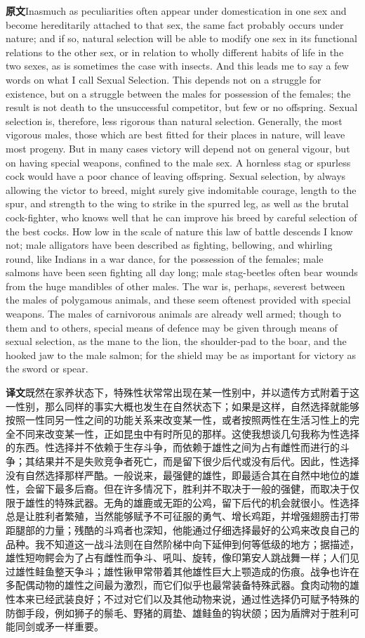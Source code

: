 \documentclass[UTF8,zihao=-4]{ctexart}
\newcommand{\BodyFont}{\fontsize{10.5pt}{15.5pt}\selectfont}
\newcommand{\origlabel}{\textbf{原文}\quad}
\newcommand{\translabel}{\textbf{译文}\quad}
\newenvironment{enblock}{\par\noindent\begingroup\BodyFont\origlabel}{\par\endgroup}
\newenvironment{zhblock}{\par\noindent\begingroup\BodyFont\translabel}{\par\endgroup\vspace{0.35em}}
\newcommand{\pair}[2]{\begin{enblock}#1\end{enblock}\begin{zhblock}#2\end{zhblock}}
\begin{document}
\pair{Inasmuch as peculiarities often appear under domestication in one sex and become hereditarily attached to that sex, the same fact probably occurs under nature; and if so, natural selection will be able to modify one sex in its functional relations to the other sex, or in relation to wholly different habits of life in the two sexes, as is sometimes the case with insects. And this leads me to say a few words on what I call Sexual Selection. This depends not on a struggle for existence, but on a struggle between the males for possession of the females; the result is not death to the unsuccessful competitor, but few or no offspring. Sexual selection is, therefore, less rigorous than natural selection. Generally, the most vigorous males, those which are best fitted for their places in nature, will leave most progeny. But in many cases victory will depend not on general vigour, but on having special weapons, confined to the male sex. A hornless stag or spurless cock would have a poor chance of leaving offspring. Sexual selection, by always allowing the victor to breed, might surely give indomitable courage, length to the spur, and strength to the wing to strike in the spurred leg, as well as the brutal cock-fighter, who knows well that he can improve his breed by careful selection of the best cocks. How low in the scale of nature this law of battle descends I know not; male alligators have been described as fighting, bellowing, and whirling round, like Indians in a war dance, for the possession of the females; male salmons have been seen fighting all day long; male stag-beetles often bear wounds from the huge mandibles of other males. The war is, perhaps, severest between the males of polygamous animals, and these seem oftenest provided with special weapons. The males of carnivorous animals are already well armed; though to them and to others, special means of defence may be given through means of sexual selection, as the mane to the lion, the shoulder-pad to the boar, and the hooked jaw to the male salmon; for the shield may be as important for victory as the sword or spear.}{既然在家养状态下，特殊性状常常出现在某一性别中，并以遗传方式附着于这一性别，那么同样的事实大概也发生在自然状态下；如果是这样，自然选择就能够按照一性同另一性之间的功能关系来改变某一性，或者按照两性在生活习性上的完全不同来改变某一性，正如昆虫中有时所见的那样。这使我想谈几句我称为性选择的东西。性选择并不依赖于生存斗争，而依赖于雄性之间为占有雌性而进行的斗争；其结果并不是失败竞争者死亡，而是留下很少后代或没有后代。因此，性选择没有自然选择那样严酷。一般说来，最强健的雄性，即最适合其在自然中地位的雄性，会留下最多后裔。但在许多情况下，胜利并不取决于一般的强健，而取决于仅限于雄性的特殊武器。无角的雄鹿或无距的公鸡，留下后代的机会就很小。性选择总是让胜利者繁殖，当然能够赋予不可征服的勇气、增长鸡距，并增强翅膀击打带距腿部的力量；残酷的斗鸡者也深知，他能通过仔细选择最好的公鸡来改良自己的品种。我不知道这一战斗法则在自然阶梯中向下延伸到何等低级的地方；据描述，雄性短吻鳄会为了占有雌性而争斗、吼叫、旋转，像印第安人跳战舞一样；人们见过雄性鲑鱼整天争斗；雄性锹甲常带着其他雄性巨大上颚造成的伤痕。战争也许在多配偶动物的雄性之间最为激烈，而它们似乎也最常装备特殊武器。食肉动物的雄性本来已经武装良好；不过对它们以及其他动物来说，通过性选择仍可赋予特殊的防御手段，例如狮子的鬃毛、野猪的肩垫、雄鲑鱼的钩状颌；因为盾牌对于胜利可能同剑或矛一样重要。}
\end{document}
